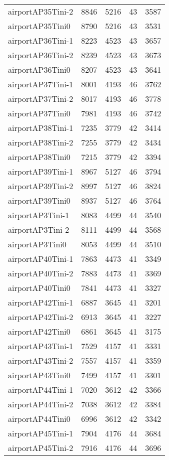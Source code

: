 \documentclass[../../../thesis.tex]{subfiles}
\begin{document}
\begin{longtable}{lrrrr}
airportAP35Tini-2 & 8846 & 5216 & 43 & 3587 \\
airportAP35Tini0 & 8790 & 5216 & 43 & 3531 \\
airportAP36Tini-1 & 8223 & 4523 & 43 & 3657 \\
airportAP36Tini-2 & 8239 & 4523 & 43 & 3673 \\
airportAP36Tini0 & 8207 & 4523 & 43 & 3641 \\
airportAP37Tini-1 & 8001 & 4193 & 46 & 3762 \\
airportAP37Tini-2 & 8017 & 4193 & 46 & 3778 \\
airportAP37Tini0 & 7981 & 4193 & 46 & 3742 \\
airportAP38Tini-1 & 7235 & 3779 & 42 & 3414 \\
airportAP38Tini-2 & 7255 & 3779 & 42 & 3434 \\
airportAP38Tini0 & 7215 & 3779 & 42 & 3394 \\
airportAP39Tini-1 & 8967 & 5127 & 46 & 3794 \\
airportAP39Tini-2 & 8997 & 5127 & 46 & 3824 \\
airportAP39Tini0 & 8937 & 5127 & 46 & 3764 \\
airportAP3Tini-1 & 8083 & 4499 & 44 & 3540 \\
airportAP3Tini-2 & 8111 & 4499 & 44 & 3568 \\
airportAP3Tini0 & 8053 & 4499 & 44 & 3510 \\
airportAP40Tini-1 & 7863 & 4473 & 41 & 3349 \\
airportAP40Tini-2 & 7883 & 4473 & 41 & 3369 \\
airportAP40Tini0 & 7841 & 4473 & 41 & 3327 \\
airportAP42Tini-1 & 6887 & 3645 & 41 & 3201 \\
airportAP42Tini-2 & 6913 & 3645 & 41 & 3227 \\
airportAP42Tini0 & 6861 & 3645 & 41 & 3175 \\
airportAP43Tini-1 & 7529 & 4157 & 41 & 3331 \\
airportAP43Tini-2 & 7557 & 4157 & 41 & 3359 \\
airportAP43Tini0 & 7499 & 4157 & 41 & 3301 \\
airportAP44Tini-1 & 7020 & 3612 & 42 & 3366 \\
airportAP44Tini-2 & 7038 & 3612 & 42 & 3384 \\
airportAP44Tini0 & 6996 & 3612 & 42 & 3342 \\
airportAP45Tini-1 & 7904 & 4176 & 44 & 3684 \\
airportAP45Tini-2 & 7916 & 4176 & 44 & 3696 \\

\end{longtable}
\end{document}
